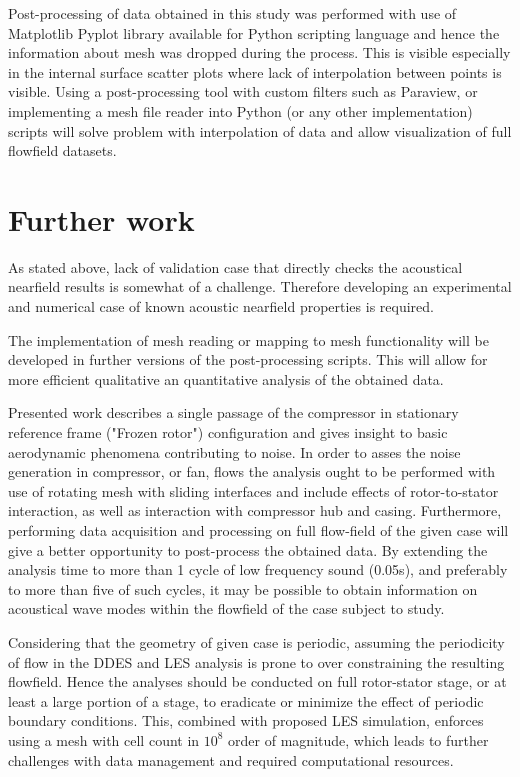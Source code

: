 Post-processing of data obtained in this study was performed with use of Matplotlib Pyplot library available for Python scripting language and hence the information about mesh was dropped during the process. This is visible especially in the internal surface scatter plots where lack of interpolation between points is visible. Using a post-processing tool with custom filters such as Paraview, or implementing a mesh file reader into Python (or any other implementation) scripts will solve problem with interpolation of data and allow visualization of full flowfield datasets.

\section{Further work}
As stated above, lack of validation case that directly checks the acoustical nearfield results is somewhat of a challenge. Therefore developing an experimental and numerical case of known acoustic nearfield properties is required. 

The implementation of mesh reading or mapping to mesh functionality will be developed in further versions of the post-processing scripts. This will allow for more efficient qualitative an quantitative analysis of the obtained data.

Presented work describes a single passage of the compressor in stationary reference frame ("Frozen rotor") configuration and gives insight to basic aerodynamic phenomena contributing to noise. In order to asses the noise generation in compressor, or fan, flows the analysis ought to be performed with use of rotating mesh with sliding interfaces and include effects of rotor-to-stator interaction, as well as interaction with compressor hub and casing. Furthermore, performing data acquisition and processing on full flow-field of the given case will give a better opportunity to post-process the obtained data. By extending the analysis time to more than 1 cycle of low frequency sound (0.05s), and preferably to more than five of such cycles, it may be possible to obtain information on acoustical wave modes within the flowfield of the case subject to study.

Considering that the geometry of given case is periodic, assuming the periodicity of flow in the DDES and LES analysis is prone to over constraining the resulting flowfield. Hence the analyses should be conducted on full rotor-stator stage, or at least a large portion of a stage, to eradicate or minimize the effect of periodic boundary conditions. This, combined with proposed LES simulation, enforces using a mesh with cell count in $10^8$ order of magnitude, which leads to further challenges with data management and required computational resources.

